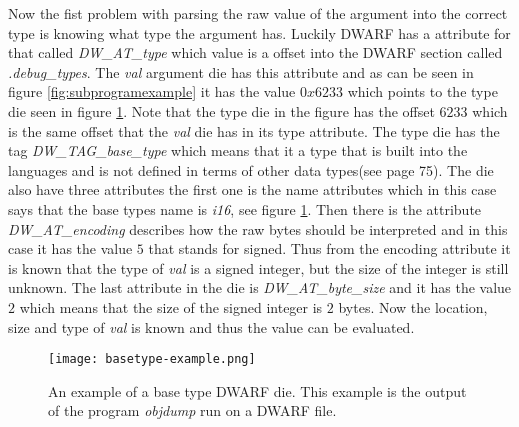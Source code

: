 Now the fist problem with parsing the raw value of the argument into the correct type is knowing what type the argument has.
Luckily \gls{DWARF} has a attribute for that called \emph{DW\_AT\_type} which value is a offset into the \gls{DWARF} section called \emph{.debug\_types}.
The \emph{val} argument \gls{die} has this attribute and as can be seen in figure \ref{fig:subprogramexample} it has the value $0x6233$ which points to the type \gls{die} seen in figure \ref{fig:basetypeexample}.
Note that the type \gls{die} in the figure has the offset $6233$ which is the same offset that the \emph{val} \gls{die} has in its type attribute.
The type \gls{die} has the tag \emph{DW\_TAG\_base\_type} which means that it a type that is built into the languages and is not defined in terms of other data types(see \cite{dwarf} page 75).
The \gls{die} also have three attributes the first one is the name attributes which in this case says that the base types name is \emph{i16}, see figure \ref{fig:basetypeexample}.
Then there is the attribute \emph{DW\_AT\_encoding} describes how the raw bytes should be interpreted and in this case it has the value $5$ that stands for signed.
Thus from the encoding attribute it is known that the type of \emph{val} is a signed integer, but the size of the integer is still unknown.
The last attribute in the \gls{die} is \emph{DW\_AT\_byte\_size} and it has the value $2$ which means that the size of the signed integer is $2$ bytes.
Now the location, size and type of \emph{val} is known and thus the value can be evaluated.


\begin{figure}[h]
	\centering
	\texttt{[image: basetype-example.png]}
	\caption{An example of a base type \gls{DWARF} \gls{die}. This example is the output of the program \emph{objdump} run on a \gls{DWARF} file.}
	\label{fig:basetypeexample}
\end{figure}

